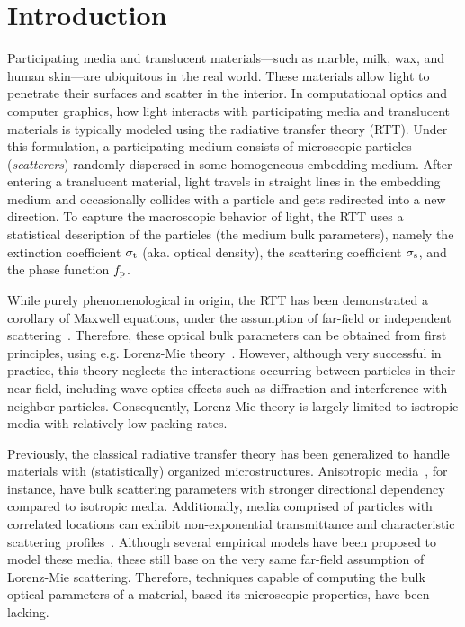 \section{Introduction}
\label{sec:intro}
%
Participating media and translucent materials---such as marble, milk, wax, and human skin---are ubiquitous in the real world. These materials allow light to penetrate their surfaces and scatter in the interior. 
%
In computational optics and computer graphics, how light interacts with participating media and translucent materials is typically modeled using the radiative transfer theory (RTT). Under this formulation, a participating medium consists of microscopic particles (\emph{scatterers}) randomly dispersed in some homogeneous embedding medium. After entering a translucent material, light travels in straight lines in the embedding medium and occasionally collides with a particle and gets redirected into a new direction. To capture the macroscopic behavior of light, the RTT uses a statistical description of the particles (the medium bulk parameters), namely the extinction coefficient $\sigma_\mathrm{t}$ (aka. optical density), the scattering coefficient $\sigma_\mathrm{s}$, and the phase function $f_\mathrm{p}$.

While purely phenomenological in origin, the RTT has been demonstrated a corollary of Maxwell equations, under the assumption of far-field or independent scattering~\cite{mishchenko2002vector}. Therefore, these optical bulk parameters can be obtained from first principles, using e.g. Lorenz-Mie theory~\cite{hulst1981light,frisvad2007computing}. However, although very successful in practice, this theory neglects the interactions occurring between particles in their near-field, including wave-optics effects such as diffraction and interference with neighbor particles. Consequently, Lorenz-Mie theory is largely limited to isotropic media with relatively low packing rates.


Previously, the classical radiative transfer theory has been generalized to handle materials with (statistically) organized microstructures. 
Anisotropic media~\cite{jakob2010radiative}, for instance, have bulk scattering parameters with stronger directional dependency compared to isotropic media.
Additionally, media comprised of particles with correlated locations can exhibit non-exponential transmittance and characteristic scattering profiles~\cite{bitterli2018radiative,jarabo2018radiative}.
Although several empirical models have been proposed to model these media, these still base on the very same far-field assumption of Lorenz-Mie scattering. Therefore, techniques capable of computing the bulk optical parameters of a material, based its microscopic properties, have been lacking.

